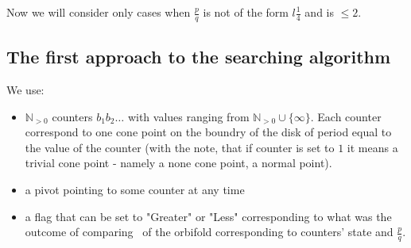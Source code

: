 Now we will consider only cases when $\frac{p}{q}$ is not of the form $l\frac{1}{4}$ and is 
$\leq 2$.
\subsection{The first approach to the searching algorithm}


We use: 
\begin{itemize}
\item $\mathbb{N}_{>0}$ counters $b_1b_2\dots$ 
with values ranging from $\mathbb{N}_{>0}\cup\{\infty\}$.
Each counter correspond to one cone point 
on the boundry of the disk of period equal to the value of the counter (with the note, that 
if counter is set to $1$ it means a trivial cone point - namely a none cone point, a normal point). 
\item a pivot pointing to some counter at any time
\item a flag that can be set to "Greater" or "Less" corresponding to what was 
the outcome of comparing \Eoc\ of the orbifold corresponding to counters' state and 
$\frac{p}{q}$.  
\end{itemize}

